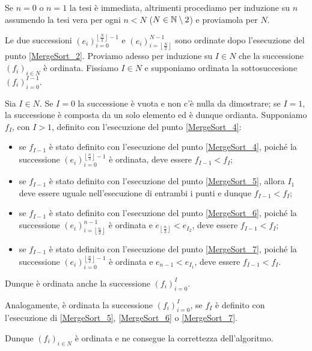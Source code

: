 \Proof Se $n = 0$ o $n = 1$ la tesi \`e immediata, altrimenti procediamo
per induzione su $n$ assumendo la tesi vera per ogni $n < N$
($N \in \mathbb{N} \setminus 2$) e proviamola per $N$.
\par Le due successioni
$(e_i)_{i = 0}^{\left \lfloor \frac{N}{2} \right \rfloor - 1}$
e 
$(e_i)_{i = \left \lfloor \frac{N}{2} \right \rfloor}^{N - 1}$
sono ordinate dopo l'esecuzione del punto \ref{MergeSort_2}.
Proviamo adesso per induzione su $I \in N$ che la successione
$(f_i)_{i \in N}$
\`e ordinata. Fissiamo $I \in N$ e supponiamo ordinata la sottosuccesione
$(f_i)_{i = 0}^{I - 1}$.
\par Sia $I \in N$. Se $I = 0$ la successione \`e vuota e non c'\`e nulla
da dimostrare; se $I = 1$, la successione \`e composta da un solo elemento ed
\`e dunque ordianta. Supponiamo $f_I$, con $I > 1$, definito con l'esecuzione
del punto \ref{MergeSort_4}:
\begin{itemize}
  \item se $f_{I - 1}$ \`e stato definito con l'esecuzione del punto
    \ref{MergeSort_4}, poich\'e la successione
    $(e_i)_{i = 0}^{\left \lfloor \frac{n}{2} \right \rfloor - 1}$
    \`e ordinata, deve essere $f_{I - 1} < f_I$;
  \item se $f_{I - 1}$ \`e stato definito con l'esecuzione del punto
    \ref{MergeSort_5}, allora $I_1$ deve essere uguale nell'esecuzione
    di entrambi i punti e dunque $f_{I - 1} < f_I$;
  \item se $f_{I - 1}$ \`e stato definito con l'esecuzione del punto
    \ref{MergeSort_6}, poich\'e la successione
    $(e_i)_{i = \left \lfloor \frac{n}{2} \right \rfloor}^{n - 1}$
    \`e ordinata e $e_{\left \lfloor \frac{n}{2} \right \rfloor} < e_{I_2}$,
    deve essere $f_{I - 1} < f_I$;
  \item se $f_{I - 1}$ \`e stato definito con l'esecuzione del punto
    \ref{MergeSort_7}, poich\'e la successione
    $(e_i)_{i = 0}^{\left \lfloor \frac{n}{2} \right \rfloor - 1}$
    \`e ordinata e $e_{n - 1} < e_{I_1}$, deve essere $f_{I - 1} < f_I$.
\end{itemize}
\par Dunque \`e ordinata anche la successione $(f_i)_{i = 0}^I$.
\par Analogamente, \`e ordinata la successione $(f_i)_{i = 0}^I$, se
$f_I$ \`e definito con l'esecuzione di \ref{MergeSort_5}, \ref{MergeSort_6}
o \ref{MergeSort_7}.
\par Dunque $(f_i)_{i \in N}$ \`e ordinata e ne consegue la correttezza
dell'algoritmo.
